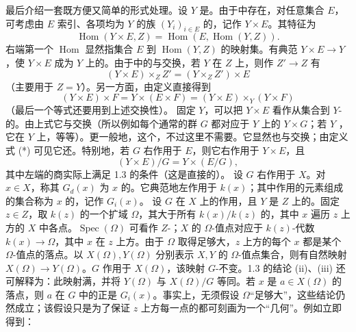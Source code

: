 最后介绍一套既方便又简单的形式处理。设 $Y$ 是。由于中存在，对任意集合 $E$，可考虑由 $E$ 索引、各项均为 $Y$ 的族 $(Y_i)_{i\in E}$ 的，记作 $Y\times E$。其特征为
\[\operatorname{Hom}(Y\times E,Z)=\operatorname{Hom}(E,\operatorname{Hom}(Y,Z)).\tag{*}\]
右端第一个 $\operatorname{Hom}$ 显然指集合 $E$ 到 $\operatorname{Hom}(Y,Z)$ 的映射集。有典范 $Y\times E\to Y$，使 $Y\times E$ 成为 $Y$ 上的。由于中的与交换，若 $Y$ 在 $Z$ 上，则作 $Z'\to Z$ 有
\[(Y\times E)\times_ZZ'=(Y\times_ZZ')\times E\]
（主要用于 $Z=Y$）。另一方面，由定义直接得到
\[(Y\times E)\times F=Y\times(E\times F)=(Y\times E)\times_Y(Y\times F)\]
（最后一个等式还要用到上述交换性）。
固定 $Y$，可以把 $Y\times E$ 看作从集合到 $Y$-的。由上式它与交换（所以例如每个通常的群 $G$ 都对应于 $Y$ 上的 $Y\times G$；若 $Y$ ，它在 $Y$ 上，等等）。更一般地，这个，不过这里不需要。它显然也与交换；由定义式 (*) 可见它还。特别地，若 $G$ 右作用于 $E$，则它右作用于 $Y\times E$，且
\[(Y\times E)/G=Y\times(E/G),\]
其中左端的商实际上满足 1.3 的条件（这是直接的）。
设 $G$ 右作用于 $X$。对 $x\in X$，称其 $G_d(x)$ 为 $x$ 的。它典范地左作用于 $k(x)$；其中作用的元素组成的集合称为 $x$ 的，记作 $G_i(x)$。
设 $G$ 在 $X$ 上的作用，且 $Y$ 是 $Z$ 上的。固定 $z\in Z$，取 $k(z)$ 的一个扩域 $\Omega$，其大于所有 $k(x)/k(z)$ 的，其中 $x$ 遍历 $z$ 上方的 $X$ 中各点。$\operatorname{Spec}(\Omega)$ 可看作 $Z$-；$X$ 的 $\Omega$-值点对应于 $k(z)$-代数 $k(x)\to\Omega$，其中 $x$ 在 $z$ 上方。由于 $\Omega$ 取得足够大，$z$ 上方的每个 $x$ 都是某个 $\Omega$-值点的落点。以 $X(\Omega),Y(\Omega)$ 分别表示 $X,Y$ 的 $\Omega$-值点集合，则有自然映射 $X(\Omega)\to Y(\Omega)$。$G$ 作用于 $X(\Omega)$，该映射 $G$-不变。1.3 的结论 (ii)、(iii) 还可解释为：此映射满，并将 $Y(\Omega)$ 与 $X(\Omega)/G$ 等同。若 $x$ 是 $a\in X(\Omega)$ 的落点，则 $a$ 在 $G$ 中的正是 $G_i(x)$。事实上，无须假设 $\Omega$“足够大”，这些结论仍然成立；该假设只是为了保证 $z$ 上方每一点的都可刻画为一个“几何”。例如立即得到：
